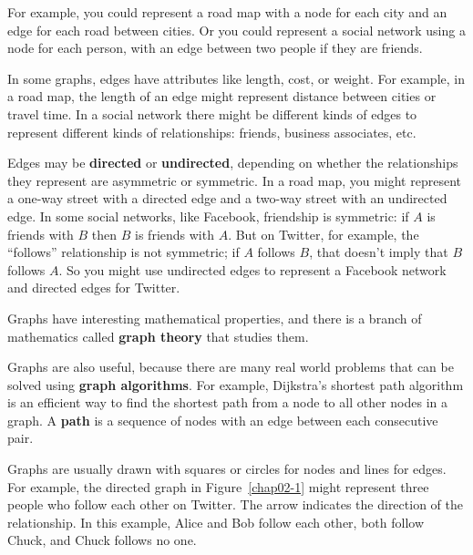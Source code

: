 \documentclass[12pt]{book}
\theoremstyle{exercise}
\begin{document}
For example, you could represent a road map with a node for each
city and an edge for each road between cities.  Or you could
represent a social network using a node for each person, with an
edge between two people if they are friends.


In some graphs, edges have attributes like length, cost, or weight.
For example, in a road map, the length of an edge might represent 
distance between cities or travel time.  In a
social network there might be different kinds of edges to represent
different kinds of relationships: friends, business associates, etc.


Edges may be {\bf directed} or {\bf undirected}, depending on whether
the relationships they represent are asymmetric or symmetric.  In a
road map, you might represent a one-way street with a directed edge
and a two-way street with an undirected edge.  In some social
networks, like Facebook, friendship is symmetric: if $A$ is friends
with $B$ then $B$ is friends with $A$.  But on Twitter, for example,
the ``follows'' relationship is not symmetric; if $A$ follows $B$,
that doesn't imply that $B$ follows $A$.  So you might use undirected
edges to represent a Facebook network and directed edges for Twitter.


Graphs have interesting mathematical properties, and
there is a branch of mathematics called {\bf graph theory}
that studies them.


Graphs are also useful, because there are many real world
problems that can be solved using {\bf graph algorithms}.
For example, Dijkstra's shortest path algorithm is an efficient
way to find the shortest path from a node to all
other nodes in a graph.  A {\bf path} is a sequence of nodes
with an edge between each consecutive pair.


Graphs are usually drawn with squares or circles for nodes and lines
for edges.  For example, the directed graph in Figure~\ref{chap02-1}
might represent three people who follow each other on Twitter.
The arrow indicates the direction of the relationship.  In this example, Alice and Bob follow each other, both follow
Chuck, and Chuck follows no one.
\end{document}
